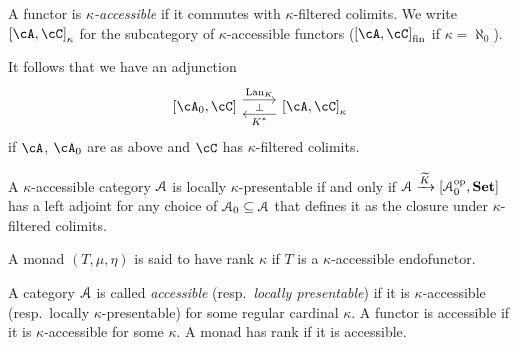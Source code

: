 \documentclass[a4paper,11pt,oneside,openany]{scrbook}
\begin{document}
\begin{defn}
	A functor is \emph{$\kappa$-accessible} if it commutes with
    $\kappa$-filtered colimits. We write $\left[\cA,\cC\right]_\kappa$ for the
    subcategory of $\kappa$-accessible functors
    ($\left[\cA,\cC\right]_{\text{fin}}$ if $\kappa=\aleph_0$).
\end{defn}
It follows that we have an adjunction
\[
	\begin{tikzcd}
		\left[\cA_0,\cC\right]\ar[r, shift left=1.2ex,"\Lan_K",""{name=A,
        below}]
        & \left[\cA,\cC\right]_\kappa\ar[l, shift left=1.2ex,
        "K^*",""{name=B,above}] \ar[from=A, to=B, "\perp"description]
	\end{tikzcd}
\]
if $\cA$, $\cA_0$ are as above and $\cC$ has $\kappa$-filtered colimits.
\begin{rmk}
	A $\kappa$-accessible category $\operatorname{\mathcal{A}}$ is locally $\kappa$-presentable if and
    only if $\operatorname{\mathcal{A}}\xrightarrow{\widetilde{K}}\left[\operatorname{\mathcal{A}}_0^{\operatorname{\text{op}}},{\normalfont\textbf{Set}}\right]$ has a
    left adjoint for any choice of $\operatorname{\mathcal{A}}_0\subseteq\operatorname{\mathcal{A}}$ that defines it as the
    closure under $\kappa$-filtered colimits.
\end{rmk}
\begin{defn}
	A monad $(T,\mu,\eta)$ is said to have rank $\kappa$ if $T$ is a $\kappa$-accessible endofunctor.
\end{defn}
\begin{defn}
	A category $\operatorname{\mathcal{A}}$ is called \emph{accessible} (resp.\ \emph{locally
    presentable}) if it is $\kappa$-accessible (resp.\ locally
    $\kappa$-presentable) for some regular cardinal $\kappa$. A functor is
    accessible if it is $\kappa$-accessible for some $\kappa$. A monad has rank
    if it is accessible.
\end{defn}
\end{document}
